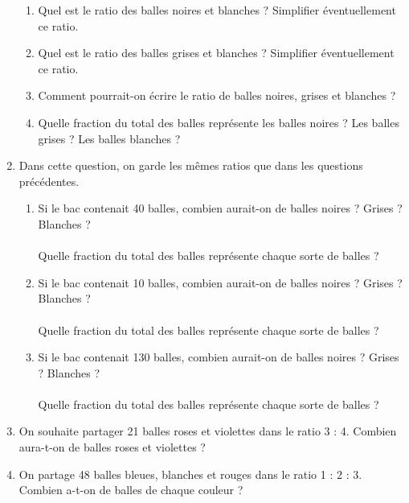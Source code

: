 \begin{activite}
\begin{QCM}
\begin{enumerate}
\begin{enumerate}
         \item Quel est le ratio des balles noires et blanches ? Simplifier éventuellement ce ratio. \\ [2mm]
            \pf \smallskip
         \item Quel est le ratio des balles grises et blanches ? Simplifier éventuellement ce ratio. \\ [2mm]
            \pf \smallskip
         \item Comment pourrait-on écrire le ratio de balles noires, grises et blanches ? \\ [2mm]
            \pf \smallskip
         \item Quelle fraction du total des balles représente les balles noires ? Les balles grises ? Les balles blanches ? \\ [2mm]
            \pf \smallskip
      \end{enumerate}
      \item Dans cette question, on garde les mêmes ratios que dans les questions précédentes.
      \begin{enumerate}
         \item Si le bac contenait 40 balles, combien aurait-on de balles noires ? Grises ? Blanches ? \\ [2mm]
            \pf \\ \smallskip
            Quelle fraction du total des balles représente chaque sorte de balles ? \\ [2mm]
            \pf \smallskip
         \item Si le bac contenait 10 balles, combien aurait-on de balles noires ? Grises ? Blanches ? \\ [2mm]
            \pf \\ \smallskip
            Quelle fraction du total des balles représente chaque sorte de balles ? \\ [2mm]
            \pf \smallskip
         \item Si le bac contenait 130 balles, combien aurait-on de balles noires ? Grises ? Blanches ? \\ [2mm]
            \pf \\ \smallskip
            Quelle fraction du total des balles représente chaque sorte de balles ? \\ [2mm]
            \pf \smallskip
      \end{enumerate}
      \item On souhaite partager 21 balles roses et violettes dans le ratio 3 : 4. Combien aura-t-on de balles roses et violettes ? \\ [3mm]
         \pf \smallskip
     \item On partage 48 balles bleues, blanches et rouges dans le ratio 1 : 2 : 3. Combien a-t-on de balles de chaque couleur ? \\ [2mm]
         \pf \\ \smallskip
      \end{enumerate}
   \end{QCM}
\end{activite}


